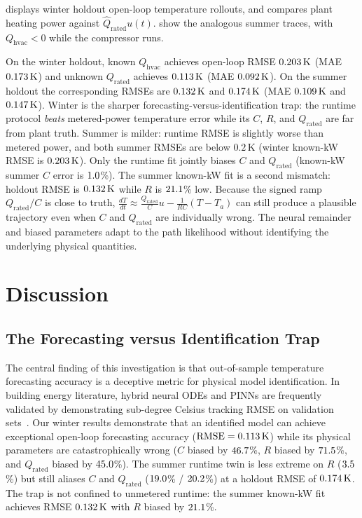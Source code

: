 \documentclass[11pt,letterpaper]{article}
\begin{document}
 displays winter holdout open-loop temperature rollouts, and  compares plant heating power against $\hat{Q}_\mathrm{rated}u(t)$.  show the analogous summer traces, with $Q_\mathrm{hvac}<0$ while the compressor runs.

On the winter holdout, known $Q_\mathrm{hvac}$ achieves open-loop RMSE $0.203\,\mathrm{K}$ (MAE $0.173\,\mathrm{K}$) and unknown $Q_\mathrm{rated}$ achieves $0.113\,\mathrm{K}$ (MAE $0.092\,\mathrm{K}$). On the summer holdout the corresponding RMSEs are $0.132\,\mathrm{K}$ and $0.174\,\mathrm{K}$ (MAE $0.109\,\mathrm{K}$ and $0.147\,\mathrm{K}$). Winter is the sharper forecasting-versus-identification trap: the runtime protocol \emph{beats} metered-power temperature error while its $C$, $R$, and $Q_\mathrm{rated}$ are far from plant truth. Summer is milder: runtime RMSE is slightly worse than metered power, and both summer RMSEs are below $0.2\,\mathrm{K}$ (winter known-kW RMSE is $0.203\,\mathrm{K}$). Only the runtime fit jointly biases $C$ and $Q_\mathrm{rated}$ (known-kW summer $C$ error is $1.0$\%). The summer known-kW fit is a second mismatch: holdout RMSE is $0.132\,\mathrm{K}$ while $R$ is $21.1$\% low. Because the signed ramp $Q_\mathrm{rated}/C$ is close to truth, $\frac{dT}{dt} \approx \frac{Q_\mathrm{rated}}{C}u - \frac{1}{RC}(T - T_a)$ can still produce a plausible trajectory even when $C$ and $Q_\mathrm{rated}$ are individually wrong. The neural remainder and biased parameters adapt to the path likelihood without identifying the underlying physical quantities.

\section{Discussion}
\label{sec:discussion}

\subsection{The Forecasting versus Identification Trap}
\label{sec:discussion-trap}
The central finding of this investigation is that out-of-sample temperature forecasting accuracy is a deceptive metric for physical model identification. In building energy literature, hybrid neural ODEs and PINNs are frequently validated by demonstrating sub-degree Celsius tracking RMSE on validation sets~\cite{gokhale2022,sievers2023}. Our winter results demonstrate that an identified model can achieve exceptional open-loop forecasting accuracy ($\mathrm{RMSE} = 0.113\,\mathrm{K}$) while its physical parameters are catastrophically wrong ($C$ biased by $46.7$\%, $R$ biased by $71.5$\%, and $Q_\mathrm{rated}$ biased by $45.0$\%). The summer runtime twin is less extreme on $R$ ($3.5$\%) but still aliases $C$ and $Q_\mathrm{rated}$ ($19.0$\% / $20.2$\%) at a holdout RMSE of $0.174\,\mathrm{K}$. The trap is not confined to unmetered runtime: the summer known-kW fit achieves RMSE $0.132\,\mathrm{K}$ with $R$ biased by $21.1$\%.
\end{document}
